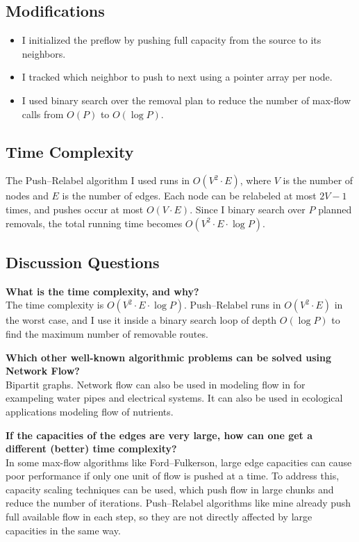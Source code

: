 \documentclass{article}
\begin{document}
\subsection*{Modifications}
\begin{itemize}
  \item I initialized the preflow by pushing full capacity from the source to its neighbors.
  \item I tracked which neighbor to push to next using a pointer array per node.
  \item I used binary search over the removal plan to reduce the number of max-flow calls from \( O(P) \) to \( O(\log P) \).
\end{itemize}

\subsection*{Time Complexity}
The Push–Relabel algorithm I used runs in \( O(V^2 \cdot E) \), where \( V \) is the number of nodes and \( E \) is the number of edges. Each node can be relabeled at most \( 2V - 1 \) times, and pushes occur at most \( O(V \cdot E) \). Since I binary search over \( P \) planned removals, the total running time becomes \( O(V^2 \cdot E \cdot \log P) \).

\subsection*{Discussion Questions}

\textbf{What is the time complexity, and why?} \\
The time complexity is \( O(V^2 \cdot E \cdot \log P) \). Push–Relabel runs in \( O(V^2 \cdot E) \) in the worst case, and I use it inside a binary search loop of depth \( O(\log P) \) to find the maximum number of removable routes.

\vspace{1em}
\textbf{Which other well-known algorithmic problems can be solved using Network Flow?} \\
Bipartit graphs.
Network flow can also be used in modeling flow in for exampeling water pipes and electrical systems. It can also be used in ecological applications modeling flow of nutrients.

\vspace{1em}
\textbf{If the capacities of the edges are very large, how can one get a different (better) time complexity?} \\
In some max-flow algorithms like Ford–Fulkerson, large edge capacities can cause poor performance if only one unit of flow is pushed at a time. To address this, capacity scaling techniques can be used, which push flow in large chunks and reduce the number of iterations. Push–Relabel algorithms like mine already push full available flow in each step, so they are not directly affected by large capacities in the same way.
\end{document}
